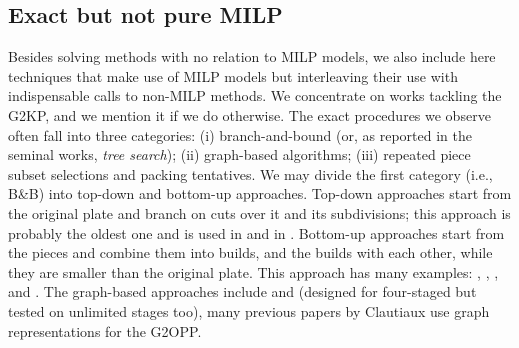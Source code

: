 \documentclass[ppgc,tese,english,formais,babel]{iiufrgs}
\begin{document}
\subsection{Exact but not pure MILP}

Besides solving methods with no relation to MILP models, we also include here techniques that make use of MILP models but interleaving their use with indispensable calls to non-MILP methods.
We concentrate on works tackling the G2KP, and we mention it if we do otherwise.
The exact procedures we observe often fall into three categories: (i) branch-and-bound (or, as reported in the seminal works, \emph{tree search}); (ii) graph-based algorithms; (iii) repeated piece subset selections and packing tentatives.
We may divide the first category (i.e., B\&B) into top-down and bottom-up approaches.
Top-down approaches start from the original plate and branch on cuts over it and its subdivisions; this approach is probably the oldest one and is used in \citet{cw:1977} and in \citet{nicos:1995:ssr}.
Bottom-up approaches start from the pieces and combine them into builds, and the builds with each other, while they are smaller than the original plate. This approach has many examples: \citet{bagchi:1993}, \citet{hifi:1997}, \citet{cung:2000}, and \citet{yoon:2013}.
The graph-based approaches include \citet{morabito:1996} and \citet{clautiaux:2018} (designed for four-staged but tested on unlimited stages too), many previous papers by Clautiaux use graph representations for the G2OPP.
\end{document}
